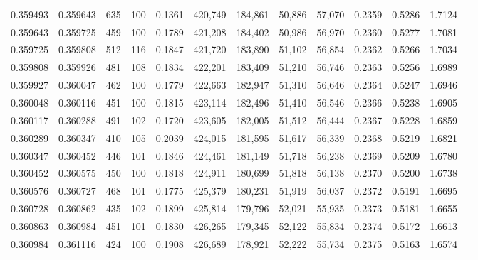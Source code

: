 \begin{tabular}{rrrrrrrrrrrrr}
0.359493 & 0.359643 &   635 & 100 &                                     0.1361 & 420,749 & 184,861 &  50,886 &  57,070 & 0.2359 & 0.5286 & 1.7124 \\
0.359643 & 0.359725 &   459 & 100 &                                     0.1789 & 421,208 & 184,402 &  50,986 &  56,970 & 0.2360 & 0.5277 & 1.7081 \\
0.359725 & 0.359808 &   512 & 116 &                                     0.1847 & 421,720 & 183,890 &  51,102 &  56,854 & 0.2362 & 0.5266 & 1.7034 \\
0.359808 & 0.359926 &   481 & 108 &                                     0.1834 & 422,201 & 183,409 &  51,210 &  56,746 & 0.2363 & 0.5256 & 1.6989 \\
0.359927 & 0.360047 &   462 & 100 &                                     0.1779 & 422,663 & 182,947 &  51,310 &  56,646 & 0.2364 & 0.5247 & 1.6946 \\
0.360048 & 0.360116 &   451 & 100 &                                     0.1815 & 423,114 & 182,496 &  51,410 &  56,546 & 0.2366 & 0.5238 & 1.6905 \\
0.360117 & 0.360288 &   491 & 102 &                                     0.1720 & 423,605 & 182,005 &  51,512 &  56,444 & 0.2367 & 0.5228 & 1.6859 \\
0.360289 & 0.360347 &   410 & 105 &                                     0.2039 & 424,015 & 181,595 &  51,617 &  56,339 & 0.2368 & 0.5219 & 1.6821 \\
0.360347 & 0.360452 &   446 & 101 &                                     0.1846 & 424,461 & 181,149 &  51,718 &  56,238 & 0.2369 & 0.5209 & 1.6780 \\
0.360452 & 0.360575 &   450 & 100 &                                     0.1818 & 424,911 & 180,699 &  51,818 &  56,138 & 0.2370 & 0.5200 & 1.6738 \\
0.360576 & 0.360727 &   468 & 101 &                                     0.1775 & 425,379 & 180,231 &  51,919 &  56,037 & 0.2372 & 0.5191 & 1.6695 \\
0.360728 & 0.360862 &   435 & 102 &                                     0.1899 & 425,814 & 179,796 &  52,021 &  55,935 & 0.2373 & 0.5181 & 1.6655 \\
0.360863 & 0.360984 &   451 & 101 &                                     0.1830 & 426,265 & 179,345 &  52,122 &  55,834 & 0.2374 & 0.5172 & 1.6613 \\
0.360984 & 0.361116 &   424 & 100 &                                     0.1908 & 426,689 & 178,921 &  52,222 &  55,734 & 0.2375 & 0.5163 & 1.6574 \\

\end{tabular}
